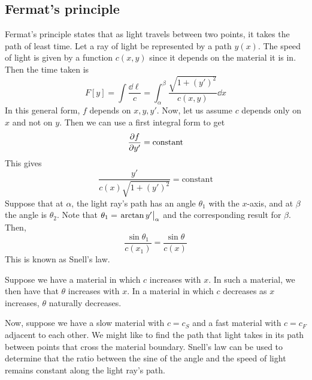 \subsection{Fermat's principle}
Fermat's principle states that as light travels between two points, it takes the path of least time.
Let a ray of light be represented by a path \( y(x) \).
The speed of light is given by a function \( c(x, y) \) since it depends on the material it is in.
Then the time taken is
\[
	F[y] = \int \frac{\dd{\ell}}{c} = \int_\alpha^\beta \frac{\sqrt{1 + (y')^2}}{c(x, y)} \dd{x}
\]
In this general form, \( f \) depends on \( x, y, y' \).
Now, let us assume \( c \) depends only on \( x \) and not on \( y \).
Then we can use a first integral form to get
\[
	\pdv{f}{y'} = \text{constant}
\]
This gives
\[
	\frac{y'}{c(x)\sqrt{1 + (y')^2}} = \text{constant}
\]
Suppose that at \( \alpha \), the light ray's path has an angle \( \theta_1 \) with the \( x \)-axis, and at \( \beta \) the angle is \( \theta_2 \).
Note that \( \theta_1 = \eval{\arctan y'}_{\alpha} \) and the corresponding result for \( \beta \).
Then,
\[
	\frac{\sin\theta_1}{c(x_1)} = \frac{\sin\theta}{c(x)}
\]
This is known as Snell's law.

Suppose we have a material in which \( c \) increases with \( x \).
In such a material, we then have that \( \theta \) increases with \( x \).
In a material in which \( c \) decreases as \( x \) increases, \( \theta \) naturally decreases.

Now, suppose we have a slow material with \( c = c_S \) and a fast material with \( c = c_F \) adjacent to each other.
We might like to find the path that light takes in its path between points that cross the material boundary.
Snell's law can be used to determine that the ratio between the sine of the angle and the speed of light remains constant along the light ray's path.
